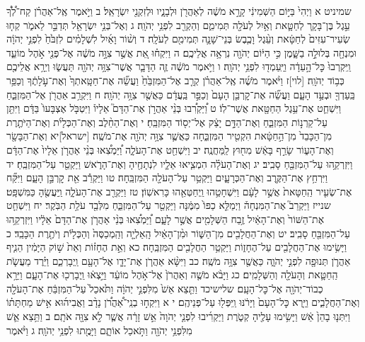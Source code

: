 \documentclass[twoside, openany, parskip=half, 11pt]{book}
\begin{document}
שמיניט א וַיְהִי֙ בַּיּ֣וֹם הַשְּׁמִינִ֔י קָרָ֣א מֹשֶׁ֔ה לְאַהֲרֹ֖ן וּלְבָנָ֑יו וּלְזִקְנֵ֖י יִשְׂרָאֵֽל׃ ב וַיֹּ֣אמֶר אֶֽל־אַהֲרֹ֗ן קַח־לְ֠ךָ֠ עֵ֣גֶל בֶּן־בָּקָ֧ר לְחַטָּ֛את וְאַ֥יִל לְעֹלָ֖ה תְּמִימִ֑ם וְהַקְרֵ֖ב לִפְנֵ֥י יְהֹוָֽה׃ ג וְאֶל־בְּנֵ֥י יִשְׂרָאֵ֖ל תְּדַבֵּ֣ר לֵאמֹ֑ר קְח֤וּ שְׂעִיר־עִזִּים֙ לְחַטָּ֔את וְעֵ֨גֶל וָכֶ֧בֶשׂ בְּנֵי־שָׁנָ֛ה תְּמִימִ֖ם לְעֹלָֽה׃ ד וְשׁ֨וֹר וָאַ֜יִל לִשְׁלָמִ֗ים לִזְבֹּ֙חַ֙ לִפְנֵ֣י יְהֹוָ֔ה וּמִנְחָ֖ה בְּלוּלָ֣ה בַשָּׁ֑מֶן כִּ֣י הַיּ֔וֹם יְהֹוָ֖ה נִרְאָ֥ה אֲלֵיכֶֽם׃ ה וַיִּקְח֗וּ אֵ֚ת אֲשֶׁ֣ר צִוָּ֣ה מֹשֶׁ֔ה אֶל־פְּנֵ֖י אֹ֣הֶל מוֹעֵ֑ד וַֽיִּקְרְבוּ֙ כׇּל־הָ֣עֵדָ֔ה וַיַּֽעַמְד֖וּ לִפְנֵ֥י יְהֹוָֽה׃ ו וַיֹּ֣אמֶר מֹשֶׁ֔ה זֶ֧ה הַדָּבָ֛ר אֲשֶׁר־צִוָּ֥ה יְהֹוָ֖ה תַּעֲשׂ֑וּ וְיֵרָ֥א אֲלֵיכֶ֖ם כְּב֥וֹד יְהֹוָֽה׃ [לוי]ז וַיֹּ֨אמֶר מֹשֶׁ֜ה אֶֽל־אַהֲרֹ֗ן קְרַ֤ב אֶל־הַמִּזְבֵּ֙חַ֙ וַעֲשֵׂ֞ה אֶת־חַטָּֽאתְךָ֙ וְאֶת־עֹ֣לָתֶ֔ךָ וְכַפֵּ֥ר בַּֽעַדְךָ֖ וּבְעַ֣ד הָעָ֑ם וַעֲשֵׂ֞ה אֶת־קׇרְבַּ֤ן הָעָם֙ וְכַפֵּ֣ר בַּֽעֲדָ֔ם כַּאֲשֶׁ֖ר צִוָּ֥ה יְהֹוָֽה׃ ח וַיִּקְרַ֥ב אַהֲרֹ֖ן אֶל־הַמִּזְבֵּ֑חַ וַיִּשְׁחַ֛ט אֶת־עֵ֥גֶל הַחַטָּ֖את אֲשֶׁר־לֽוֹ׃ ט וַ֠יַּקְרִ֠בוּ בְּנֵ֨י אַהֲרֹ֣ן אֶת־הַדָּם֮ אֵלָיו֒ וַיִּטְבֹּ֤ל אֶצְבָּעוֹ֙ בַּדָּ֔ם וַיִּתֵּ֖ן עַל־קַרְנ֣וֹת הַמִּזְבֵּ֑חַ וְאֶת־הַדָּ֣ם יָצַ֔ק אֶל־יְס֖וֹד הַמִּזְבֵּֽחַ׃ י וְאֶת־הַחֵ֨לֶב וְאֶת־הַכְּלָיֹ֜ת וְאֶת־הַיֹּתֶ֤רֶת מִן־הַכָּבֵד֙ מִן־הַ֣חַטָּ֔את הִקְטִ֖יר הַמִּזְבֵּ֑חָה כַּאֲשֶׁ֛ר צִוָּ֥ה יְהֹוָ֖ה אֶת־מֹשֶֽׁה׃ [ישראל]יא וְאֶת־הַבָּשָׂ֖ר וְאֶת־הָע֑וֹר שָׂרַ֣ף בָּאֵ֔שׁ מִח֖וּץ לַֽמַּחֲנֶֽה׃ יב וַיִּשְׁחַ֖ט אֶת־הָעֹלָ֑ה וַ֠יַּמְצִ֠אוּ בְּנֵ֨י אַהֲרֹ֤ן אֵלָיו֙ אֶת־הַדָּ֔ם וַיִּזְרְקֵ֥הוּ עַל־הַמִּזְבֵּ֖חַ סָבִֽיב׃ יג וְאֶת־הָעֹלָ֗ה הִמְצִ֧יאוּ אֵלָ֛יו לִנְתָחֶ֖יהָ וְאֶת־הָרֹ֑אשׁ וַיַּקְטֵ֖ר עַל־הַמִּזְבֵּֽחַ׃ יד וַיִּרְחַ֥ץ אֶת־הַקֶּ֖רֶב וְאֶת־הַכְּרָעָ֑יִם וַיַּקְטֵ֥ר עַל־הָעֹלָ֖ה הַמִּזְבֵּֽחָה׃ טו וַיַּקְרֵ֕ב אֵ֖ת קׇרְבַּ֣ן הָעָ֑ם וַיִּקַּ֞ח אֶת־שְׂעִ֤יר הַֽחַטָּאת֙ אֲשֶׁ֣ר לָעָ֔ם וַיִּשְׁחָטֵ֥הוּ וַֽיְחַטְּאֵ֖הוּ כָּרִאשֽׁוֹן׃ טז וַיַּקְרֵ֖ב אֶת־הָעֹלָ֑ה וַֽיַּעֲשֶׂ֖הָ כַּמִּשְׁפָּֽט׃ שנייז וַיַּקְרֵב֮ אֶת־הַמִּנְחָה֒ וַיְמַלֵּ֤א כַפּוֹ֙ מִמֶּ֔נָּה וַיַּקְטֵ֖ר עַל־הַמִּזְבֵּ֑חַ מִלְּבַ֖ד עֹלַ֥ת הַבֹּֽקֶר׃ יח וַיִּשְׁחַ֤ט אֶת־הַשּׁוֹר֙ וְאֶת־הָאַ֔יִל זֶ֥בַח הַשְּׁלָמִ֖ים אֲשֶׁ֣ר לָעָ֑ם וַ֠יַּמְצִ֠אוּ בְּנֵ֨י אַהֲרֹ֤ן אֶת־הַדָּם֙ אֵלָ֔יו וַיִּזְרְקֵ֥הוּ עַל־הַמִּזְבֵּ֖חַ סָבִֽיב׃ יט וְאֶת־הַחֲלָבִ֖ים מִן־הַשּׁ֑וֹר וּמִ֨ן־הָאַ֔יִל הָֽאַלְיָ֤ה וְהַֽמְכַסֶּה֙ וְהַכְּלָיֹ֔ת וְיֹתֶ֖רֶת הַכָּבֵֽד׃ כ וַיָּשִׂ֥ימוּ אֶת־הַחֲלָבִ֖ים עַל־הֶחָז֑וֹת וַיַּקְטֵ֥ר הַחֲלָבִ֖ים הַמִּזְבֵּֽחָה׃ כא וְאֵ֣ת הֶחָז֗וֹת וְאֵת֙ שׁ֣וֹק הַיָּמִ֔ין הֵנִ֧יף אַהֲרֹ֛ן תְּנוּפָ֖ה לִפְנֵ֣י יְהֹוָ֑ה כַּאֲשֶׁ֖ר צִוָּ֥ה מֹשֶֽׁה׃ כב וַיִּשָּׂ֨א אַהֲרֹ֧ן אֶת־יָדָ֛ו אֶל־הָעָ֖ם וַֽיְבָרְכֵ֑ם וַיֵּ֗רֶד מֵעֲשֹׂ֧ת הַֽחַטָּ֛את וְהָעֹלָ֖ה וְהַשְּׁלָמִֽים׃ כג וַיָּבֹ֨א מֹשֶׁ֤ה וְאַהֲרֹן֙ אֶל־אֹ֣הֶל מוֹעֵ֔ד וַיֵּ֣צְא֔וּ וַֽיְבָרְכ֖וּ אֶת־הָעָ֑ם וַיֵּרָ֥א כְבוֹד־יְהֹוָ֖ה אֶל־כׇּל־הָעָֽם׃ שלישיכד וַתֵּ֤צֵא אֵשׁ֙ מִלִּפְנֵ֣י יְהֹוָ֔ה וַתֹּ֙אכַל֙ עַל־הַמִּזְבֵּ֔חַ אֶת־הָעֹלָ֖ה וְאֶת־הַחֲלָבִ֑ים וַיַּ֤רְא כׇּל־הָעָם֙ וַיָּרֹ֔נּוּ וַֽיִּפְּל֖וּ עַל־פְּנֵיהֶֽם׃ י א וַיִּקְח֣וּ בְנֵֽי־אַ֠הֲרֹ֠ן נָדָ֨ב וַאֲבִיה֜וּא אִ֣ישׁ מַחְתָּת֗וֹ וַיִּתְּנ֤וּ בָהֵן֙ אֵ֔שׁ וַיָּשִׂ֥ימוּ עָלֶ֖יהָ קְטֹ֑רֶת וַיַּקְרִ֜יבוּ לִפְנֵ֤י יְהֹוָה֙ אֵ֣שׁ זָרָ֔ה אֲשֶׁ֧ר לֹ֦א צִוָּ֖ה אֹתָֽם׃ ב וַתֵּ֥צֵא אֵ֛שׁ מִלִּפְנֵ֥י יְהֹוָ֖ה וַתֹּ֣אכַל אוֹתָ֑ם וַיָּמֻ֖תוּ לִפְנֵ֥י יְהֹוָֽה׃ ג וַיֹּ֨אמֶר 
\end{document}
